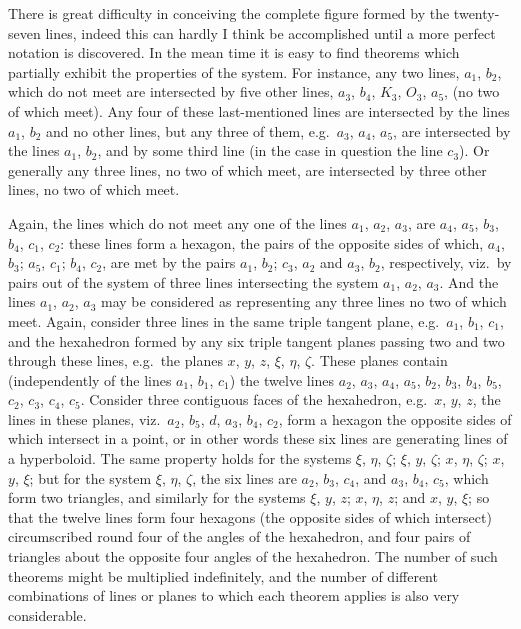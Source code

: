 \documentclass[11pt,a4paper]{article}
\theoremstyle{definition}
\begin{document}
\newpage

\setcounter{page}{453}

There is great difficulty in conceiving the complete figure formed by the twenty-seven lines, indeed this can hardly I think be accomplished until a more perfect notation is discovered. In the mean time it is easy to find theorems which partially exhibit the properties of the system. For instance, any two lines, $a_{1}$, $b_{2}$, which do not meet are intersected by five other lines, $a_{3}$, $b_{4}$, $K_{3}$, $O_{3}$, $a_{5}$, (no two of which meet). Any four of these last-mentioned lines are intersected by the lines $a_{1}$, $b_{2}$ and no other lines, but any three of them, e.g.\ $a_{3}$, $a_{4}$, $a_{5}$, are intersected by the lines $a_{1}$, $b_{2}$, and by some third line (in the case in question the line $c_{3}$). Or generally any three lines, no two of which meet, are intersected by three other lines, no two of which meet.

Again, the lines which do not meet any one of the lines $a_{1}$, $a_{2}$, $a_{3}$, are $a_{4}$, $a_{5}$, $b_{3}$, $b_{4}$, $c_{1}$, $c_{2}$: these lines form a hexagon, the pairs of the opposite sides of which, $a_{4}$, $b_{3}$; $a_{5}$, $c_{1}$; $b_{4}$, $c_{2}$, are met by the pairs $a_{1}$, $b_{2}$; $c_{3}$, $a_{2}$ and $a_{3}$, $b_{2}$, respectively, viz.\ by pairs out of the system of three lines intersecting the system $a_{1}$, $a_{2}$, $a_{3}$. And the lines $a_{1}$, $a_{2}$, $a_{3}$ may be considered as representing any three lines no two of which meet. Again, consider three lines in the same triple tangent plane, e.g.\ $a_{1}$, $b_{1}$, $c_{1}$, and the hexahedron formed by any six triple tangent planes passing two and two through these lines, e.g.\ the planes $x$, $y$, $z$, $\xi$, $\eta$, $\zeta$. These planes contain (independently of the lines $a_{1}$, $b_{1}$, $c_{1}$) the twelve lines $a_{2}$, $a_{3}$, $a_{4}$, $a_{5}$, $b_{2}$, $b_{3}$, $b_{4}$, $b_{5}$, $c_{2}$, $c_{3}$, $c_{4}$, $c_{5}$. Consider three contiguous faces of the hexahedron, e.g.\ $x$, $y$, $z$, the lines in these planes, viz.\ $a_{2}$, $b_{5}$, $d$, $a_{3}$, $b_{4}$, $c_{2}$, form a hexagon the opposite sides of which intersect in a point, or in other words these six lines are generating lines of a hyperboloid. The same property holds for the systems $\xi$, $\eta$, $\zeta$; $\xi$, $y$, $\zeta$; $x$, $\eta$, $\zeta$; $x$, $y$, $\xi$; but for the system $\xi$, $\eta$, $\zeta$, the six lines are $a_{2}$, $b_{3}$, $c_{4}$, and $a_{3}$, $b_{4}$, $c_{5}$, which form two triangles, and similarly for the systems $\xi$, $y$, $z$; $x$, $\eta$, $z$; and $x$, $y$, $\xi$; so that the twelve lines form four hexagons (the opposite sides of which intersect) circumscribed round four of the angles of the hexahedron, and four pairs of triangles about the opposite four angles of the hexahedron. The number of such theorems might be multiplied indefinitely, and the number of different combinations of lines or planes to which each theorem applies is also very considerable.
\end{document}
